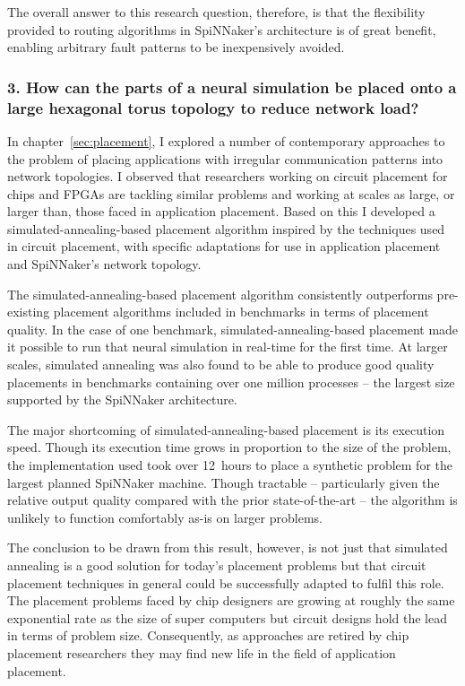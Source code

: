 		The overall answer to this research question, therefore, is that the
		flexibility provided to routing algorithms in SpiNNaker's architecture is
		of great benefit, enabling arbitrary fault patterns to be inexpensively
		avoided.
		
		\subsubsection{3. How can the parts of a neural simulation be placed onto a
		large hexagonal torus topology to reduce network load?}
		
		In chapter~\ref{sec:placement}, I explored a number of contemporary
		approaches to the problem of placing applications with irregular
		communication patterns into network topologies. I observed that researchers
		working on circuit placement for chips and FPGAs are tackling similar
		problems and working at scales as large, or larger than, those faced in
		application placement. Based on this I developed a
		simulated-annealing-based placement algorithm inspired by the techniques
		used in circuit placement, with specific adaptations for use in application
		placement and SpiNNaker's network topology.
		
		The simulated-annealing-based placement algorithm consistently outperforms
		pre-existing placement algorithms included in benchmarks in terms of
		placement quality.  In the case of one benchmark, simulated-annealing-based
		placement made it possible to run that neural simulation in real-time for
		the first time.  At larger scales, simulated annealing was also found to be
		able to produce good quality placements in benchmarks containing over one
		million processes -- the largest size supported by the SpiNNaker
		architecture.
		
		The major shortcoming of simulated-annealing-based placement is its
		execution speed. Though its execution time grows in proportion to the size
		of the problem, the implementation used took over 12~hours to place a
		synthetic problem for the largest planned SpiNNaker machine. Though
		tractable -- particularly given the relative output quality compared with
		the prior state-of-the-art -- the algorithm is unlikely to function
		comfortably as-is on larger problems.
		
		The conclusion to be drawn from this result, however, is not just that
		simulated annealing is a good solution for today's placement problems but
		that circuit placement techniques in general could be successfully adapted
		to fulfil this role. The placement problems faced by chip designers are
		growing at roughly the same exponential rate as the size of super computers
		but circuit designs hold the lead in terms of problem size. Consequently,
		as approaches are retired by chip placement researchers they may find new
		life in the field of application placement.
		
